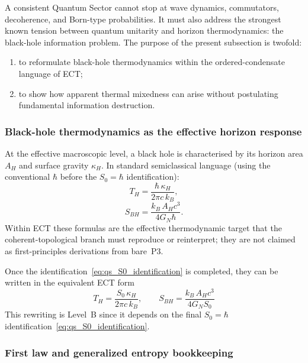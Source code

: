 \medskip
A consistent Quantum Sector cannot stop at wave dynamics, commutators,
decoherence, and Born-type probabilities.
It must also address the strongest known tension between quantum
unitarity and horizon thermodynamics: the black-hole information
problem.
The purpose of the present subsection is twofold:
\begin{enumerate}[label=(\roman*)]
  \item to reformulate black-hole thermodynamics within the
    ordered-condensate language of ECT;
  \item to show how apparent thermal mixedness can arise without
    postulating fundamental information destruction.
\end{enumerate}

\subsubsection*{Black-hole thermodynamics as the effective horizon response}

At the effective macroscopic level, a black hole is characterised by
its horizon area $A_H$ and surface gravity $\kappa_H$.
In standard semiclassical language (using the conventional $\hbar$
before the $S_0=\hbar$ identification):
\begin{equation}
  \label{eq:qs_Hawking_temp}
  T_H
  =
  \frac{\hbar\,\kappa_H}{2\pi c\,k_B},
\end{equation}
\begin{equation}
  \label{eq:qs_BH_entropy}
  S_{BH}
  =
  \frac{k_B\,A_H c^3}{4G_N\hbar}.
\end{equation}
Within ECT these formulas are the effective thermodynamic target that
the coherent-topological branch must reproduce or reinterpret; they are
not claimed as first-principles derivations from bare~P3.

Once the identification~\eqref{eq:qs_S0_identification} is completed,
they can be written in the equivalent ECT form
\begin{equation}
  \label{eq:qs_Hawking_temp_S0}
  T_H
  =
  \frac{S_0\,\kappa_H}{2\pi c\,k_B},
  \qquad
  S_{BH}
  =
  \frac{k_B\,A_H c^3}{4G_N S_0}
\end{equation}
This rewriting is Level~B since it depends on the final
$S_0=\hbar$ identification~\eqref{eq:qs_S0_identification}.

\subsubsection*{First law and generalized entropy bookkeeping}

